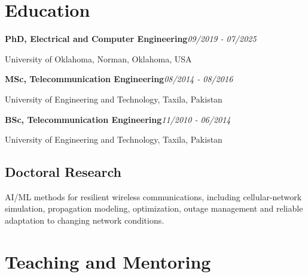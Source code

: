 \documentclass[8pt,letterpaper]{extarticle}
\newcommand{\entry}[2]{\Needspace{4\baselineskip}\textbf{#1}\hfill\textit{#2}\par}
\begin{document}
\section{Education}
\entry{PhD, Electrical and Computer Engineering}{09/2019 - 07/2025}
University of Oklahoma, Norman, Oklahoma, USA\par
\entry{MSc, Telecommunication Engineering}{08/2014 - 08/2016}
University of Engineering and Technology, Taxila, Pakistan\par
\entry{BSc, Telecommunication Engineering}{11/2010 - 06/2014}
University of Engineering and Technology, Taxila, Pakistan\par
{}
\subsection{Doctoral Research}
AI/ML methods for resilient wireless communications, including cellular-network simulation, propagation modeling, optimization, outage management and reliable adaptation to changing network conditions.\par
{}
\section{Teaching and Mentoring}
\end{document}
